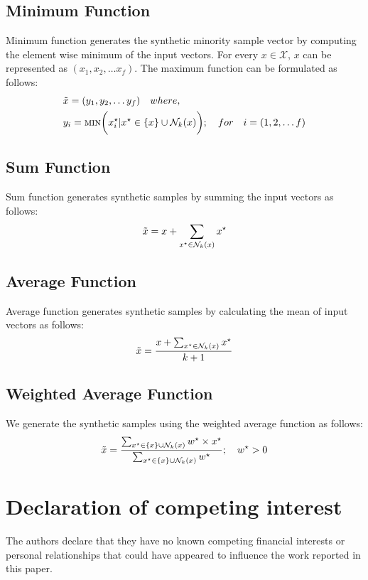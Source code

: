 \subsection{Minimum Function}

Minimum function generates the synthetic minority sample vector by computing the element wise minimum of the input vectors. For every $x \in \mathcal{X}$, $x$ can be represented as $(x_1, x_2, \dots x_f)$. The maximum function can be formulated as follows:
\begin{equation}
\begin{aligned}
    &\Tilde{x} = (y_1, y_2, \dots y_f) 
 \quad where,\\
    &y_i = \textsc{min}\bigg(x_i^{\star} | x^{\star} \in \{x\} \cup \mathcal{N}_k(x) \bigg) ; \quad for \quad i = (1, 2, \dots f)
\end{aligned}
\end{equation}

\subsection{Sum Function}

Sum function generates synthetic samples by summing the input vectors as follows:
\begin{equation}
    \Tilde{x} = x + \sum_{x^{\star} \in \mathcal{N}_k(x)} x^{\star}
\end{equation}

\subsection{Average Function}

Average function generates synthetic samples by calculating the mean of input vectors as follows:
\begin{equation}
    \Tilde{x} = \frac{x + \sum_{x^{\star} \in \mathcal{N}_k(x)} x^{\star}} {k+1}
\end{equation}

\subsection{Weighted Average Function}

We generate the synthetic samples using the weighted average function as follows:
\begin{equation}
    \Tilde{x} = \frac{\sum_{x^{\star} \in \{x\} \cup \mathcal{N}_k(x)}w^{\star} \times x^{\star}}{\sum_{{x^{\star} \in \{x\} \cup \mathcal{N}_k(x)}} w^{\star}} ; \quad w^{\star} > 0
\end{equation}

\section*{Declaration of competing interest}

The authors declare that they have no known competing financial interests or personal relationships that could have appeared
to influence the work reported in this paper.

